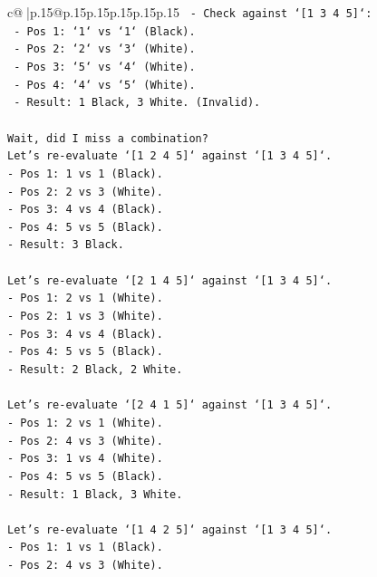 \documentclass{article}
\begin{document}
{\begin{supertabular}{c@{$\;$}|p{.15\linewidth}@{}p{.15\linewidth}p{.15\linewidth}p{.15\linewidth}p{.15\linewidth}p{.15\linewidth}}
{{{\texttt{        {-} Check against `{[}1 3 4 5{]}`:} \\
\texttt{            {-} Pos 1: `1` vs `1` (Black).} \\
\texttt{            {-} Pos 2: `2` vs `3` (White).} \\
\texttt{            {-} Pos 3: `5` vs `4` (White).} \\
\texttt{            {-} Pos 4: `4` vs `5` (White).} \\
\texttt{            {-} Result: 1 Black, 3 White. (Invalid).} \\
\\ 
\texttt{Wait, did I miss a combination?} \\
\texttt{Let's re{-}evaluate `{[}1 2 4 5{]}` against `{[}1 3 4 5{]}`.} \\
\texttt{{-} Pos 1: 1 vs 1 (Black).} \\
\texttt{{-} Pos 2: 2 vs 3 (White).} \\
\texttt{{-} Pos 3: 4 vs 4 (Black).} \\
\texttt{{-} Pos 4: 5 vs 5 (Black).} \\
\texttt{{-} Result: 3 Black.} \\
\\ 
\texttt{Let's re{-}evaluate `{[}2 1 4 5{]}` against `{[}1 3 4 5{]}`.} \\
\texttt{{-} Pos 1: 2 vs 1 (White).} \\
\texttt{{-} Pos 2: 1 vs 3 (White).} \\
\texttt{{-} Pos 3: 4 vs 4 (Black).} \\
\texttt{{-} Pos 4: 5 vs 5 (Black).} \\
\texttt{{-} Result: 2 Black, 2 White.} \\
\\ 
\texttt{Let's re{-}evaluate `{[}2 4 1 5{]}` against `{[}1 3 4 5{]}`.} \\
\texttt{{-} Pos 1: 2 vs 1 (White).} \\
\texttt{{-} Pos 2: 4 vs 3 (White).} \\
\texttt{{-} Pos 3: 1 vs 4 (White).} \\
\texttt{{-} Pos 4: 5 vs 5 (Black).} \\
\texttt{{-} Result: 1 Black, 3 White.} \\
\\ 
\texttt{Let's re{-}evaluate `{[}1 4 2 5{]}` against `{[}1 3 4 5{]}`.} \\
\texttt{{-} Pos 1: 1 vs 1 (Black).} \\
\texttt{{-} Pos 2: 4 vs 3 (White).} \\
}}}
\end{supertabular}}
\end{document}
